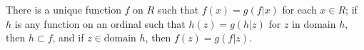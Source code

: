 There is a unique function $f$ on $R$ such that $f(x) = g(f|x)$ for each $x \in R$; if $h$ is any function on an ordinal such that $h(z) = g(h|z)$ for $z$ in $\text{domain } h$, then $h \subset f$, and if $z \in \text{domain } h$, then $f(z) = g(f|z)$.
